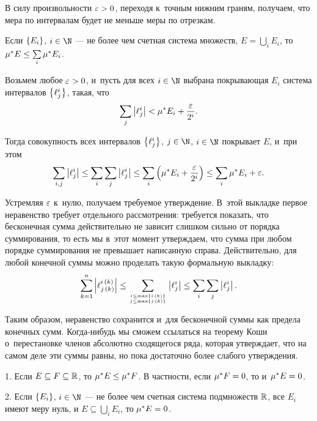 \documentclass[draft]{article}
\begin{document}
В силу произвольности $\varepsilon > 0$, переходя к~точным нижним граням,
получаем, что мера по интервалам будет не меньше меры по отрезкам.

\prut

\eject

\ut

Если $\left\{E_i\right\}$, $\inat$ --- не более чем счетная система множеств,
$E=\bigcup\limits_i E_i$, то $\mu^* E \le \sum\limits_i\mu^* E_i$.

\pr

Возьмем любое $\varepsilon > 0$, и~пусть для всех $\inat$ выбрана покрывающая
$E_i$ система интервалов $\set\lij$, такая, что
$$\sum\limits_j\abs\lij<\mes{E_i}+{\ep\over2^i}.$$

Тогда совокупность всех интервалов $\set\lij$, $j\in\N$, $\inat$
покрывает $E$, и~при этом
$$\sum\limits_{i,j}\abs\lij\le\sum\limits_i\sum\limits_j\abs\lij\le
\sumi\at(\mes{E_i}+{\ep\over2^i})\le\sumi\mes{E_i}+\ep.$$

Устремляя $\varepsilon$ к~нулю, получаем требуемое утверждение. В~этой
выкладке первое неравенство требует отдельного рассмотрения:
требуется показать, что бесконечная сумма действительно не зависит
слишком сильно от порядка суммирования, то есть мы в~этот момент
утверждаем, что сумма при любом порядке суммирования не превышает
написанную справа. Действительно, для любой конечной суммы можно
проделать такую формальную выкладку:
$$\sum\limits_{k=1}^n\abs{\l({j\,\at(k)},{i\,\at(k)})}\le
           \sum\limits_{{i\le\max\set{i\,\at(k)}}\atop{j\le\max\set{j\,\at(k)}}}
           \abs\lij\le\sumi\sum\limits_j\abs\lij.$$

Таким образом, неравенство сохранится и~для бесконечной суммы как
предела конечных сумм. Когда-нибудь мы сможем ссылаться на теорему
Коши о~перестановке членов абсолютно сходящегося ряда, которая
утверждает, что на самом деле эти суммы равны, но пока достаточно
более слабого утверждения.

\prut

\bigskip

\uts

\smallskip

1. Если $E\subseteq F\subseteq\mathbb{R}$, то $\mu^*{E}\le\mu^*{F}$. В
частности, если $\mu^*{F}=0$, то и~$\mu^*{E}=0$.

\smallskip

2. Если $\left\{E_i\right\}$, $\inat$ --- не более чем счетная система
подмножеств $\mathbb{R}$, все $E_i$ имеют меру нуль, и
$E\subseteq\bigcup\limits_i E_i$, то $\mu^*{E}=0$.

\smallskip
\end{document}
